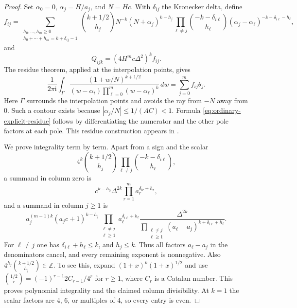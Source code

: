 \documentclass[12pt]{article}
\numberwithin{equation}{section}
\begin{document}
\begin{proof}
Set $\alpha_0=0$, $\alpha_j=H/a_j$, and $N=Hc$.  With $\delta_{ij}$
the Kronecker delta, define
\begin{equation}\label{eq:ordinary-explicit-residue}
 f_{ij}=
 \sum_{\substack{h_0,\ldots,h_m\ge0\\
                  h_0+\cdots+h_m=k+\delta_{ij}-1}}
 \binom{k+1/2}{h_j}N^{-k}(N+\alpha_j)^{k-h_j}
 \prod_{\ell\ne j}
 \binom{-k-\delta_{i\ell}}{h_\ell}
 (\alpha_j-\alpha_\ell)^{-k-\delta_{i\ell}-h_\ell},
\end{equation}
and
\[
 Q_{ijk}=(4H^mc\Delta^2)^k f_{ij}.
\]
The residue theorem, applied at the interpolation points, gives
\begin{equation}\label{eq:ordinary-contour}
 \frac1{2\pi\mathrm i}\int_\Gamma
 \frac{(1+w/N)^{k+1/2}}
 {(w-\alpha_i)\prod_{\ell=0}^m(w-\alpha_\ell)^k}\,dw
 =\sum_{j=0}^mf_{ij}\theta_j.
\end{equation}
Here $\Gamma$ surrounds the interpolation points and avoids the ray from
$-N$ away from $0$.  Such a contour exists because
$|\alpha_j/N|\le1/(AC)<1$.  Formula
\eqref{eq:ordinary-explicit-residue} follows by differentiating the
numerator and the other pole factors at each pole.  This residue construction appears in \cite[\S7]{JZ}.

We prove integrality term by term.  Apart from
a sign and the scalar
\[
 4^k\binom{k+1/2}{h_j}
       \prod_{\ell\ne j}\binom{-k-\delta_{i\ell}}{h_\ell},
\]
a summand in column zero is
\[
 c^{k-h_0}\Delta^{2k}
       \prod_{r=1}^m a_r^{\delta_{ir}+h_r},
\]
and a summand in column $j\ge1$ is
\begin{equation}\label{eq:ordinary-polynomial-summand}
 a_j^{(m-1)k}(a_jc+1)^{k-h_j}
 \prod_{\substack{\ell\ne j\\\ell\ge1}}
       a_\ell^{\delta_{i\ell}+h_\ell}
 \frac{\Delta^{2k}}
 {\displaystyle\prod_{\substack{\ell\ne j\\\ell\ge1}}
 (a_\ell-a_j)^{k+\delta_{i\ell}+h_\ell}}.
\end{equation}
For $\ell\ne j$ one has $\delta_{i\ell}+h_\ell\le k$, and
$h_j\le k$.  Thus all factors $a_\ell-a_j$ in the denominators cancel, and every remaining exponent is nonnegative.  Also
$4^{h_j}\binom{k+1/2}{h_j}\in\mathbb Z$. To see this, expand
$(1+x)^k(1+x)^{1/2}$ and use
$\binom{1/2}{r}=(-1)^{r-1}2C_{r-1}/4^r$ for $r\ge1$, where
$C_r$ is a Catalan number.  This proves polynomial integrality and the
claimed column divisibility.  At $k=1$ the scalar factors are $4$, $6$,
or multiples of $4$, so every entry is even.


\end{proof}
\end{document}
